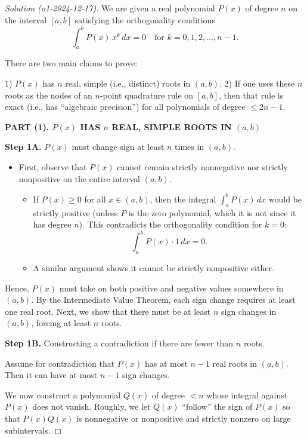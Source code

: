 \documentclass[11pt]{article}
\numberwithin{equation}{section}
\begin{document}
\begin{proof}[Solution (o1-2024-12-17)]


We are given a real polynomial $P(x)$ of degree $n$ on the interval $[a,b]$ satisfying the orthogonality conditions  
\[
\int_a^b P(x)\, x^k\, dx = 0 \quad \text{for } k = 0,1,2,\dots,n-1.
\]

There are two main claims to prove:

1) $P(x)$ has $n$ real, simple (i.e., distinct) roots in $(a,b)$.  
2) If one uses these $n$ roots as the nodes of an $n$-point quadrature rule on $[a,b]$, then that rule is exact (i.e., has ``algebraic precision'') for all polynomials of degree $\le 2n-1$.


\textbf{PART (1).  $P(x)$ HAS $n$ REAL, SIMPLE ROOTS IN $(a,b)$}


\textbf{Step 1A.} $P(x)$ must change sign at least $n$ times in $(a,b)$.

\begin{itemize}
\item First, observe that $P(x)$ cannot remain strictly nonnegative nor strictly nonpositive on the entire interval $(a,b)$.
    \begin{itemize}
    \item If $P(x)\ge 0$ for all $x\in (a,b)$, then the integral $\int_a^b P(x)\, dx$ would be strictly positive (unless $P$ is the zero polynomial, which it is not since it has degree $n$).  This contradicts the orthogonality condition for $k=0$:
    \[
    \int_a^b P(x)\cdot 1\, dx = 0.
    \]
    \item A similar argument shows it cannot be strictly nonpositive either.
    \end{itemize}
\end{itemize}

Hence, $P(x)$ must take on both positive and negative values somewhere in $(a,b)$.  By the Intermediate Value Theorem, each sign change requires at least one real root.  Next, we show that there must be at least $n$ sign changes in $(a,b)$, forcing at least $n$ roots.

\textbf{Step 1B.} Constructing a contradiction if there are fewer than $n$ roots.

Assume for contradiction that $P(x)$ has at most $n-1$ real roots in $(a,b)$.  Then it can have at most $n-1$ sign changes.

We now construct a polynomial $Q(x)$ of degree $<n$ whose integral against $P(x)$ does not vanish.  Roughly, we let $Q(x)$ ``follow'' the sign of $P(x)$ so that $P(x)Q(x)$ is nonnegative or nonpositive and strictly nonzero on large subintervals.


\end{proof}
\end{document}

